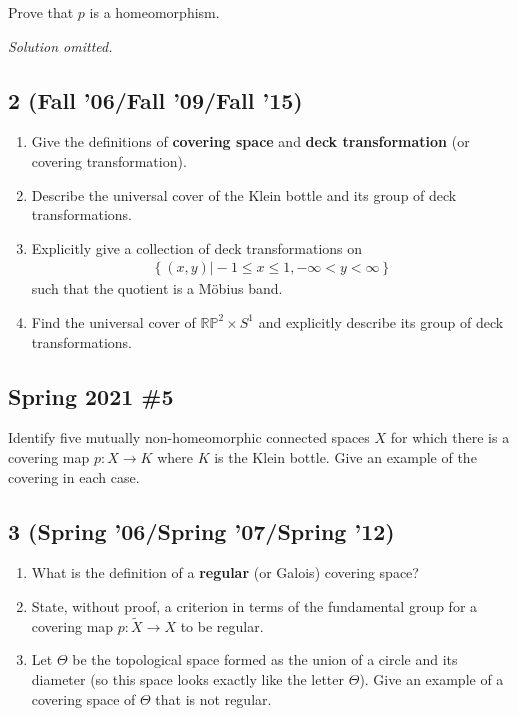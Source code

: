 Prove that \(p\) is a homeomorphism.


\emph{Solution omitted.}

\hypertarget{fall-06fall-09fall-15}{%
\subsection{2 (Fall '06/Fall '09/Fall
'15)}\label{fall-06fall-09fall-15}}

\begin{enumerate}
\def\labelenumi{\alph{enumi}.}
\item
  Give the definitions of \textbf{covering space} and \textbf{deck
  transformation} (or covering transformation).
\item
  Describe the universal cover of the Klein bottle and its group of deck
  transformations.
\item
  Explicitly give a collection of deck transformations on
  \begin{align*}\left\{{(x, y) \mathrel{\Big|}-1 \leq x \leq 1, -\infty < y < \infty}\right\}\end{align*}
  such that the quotient is a Möbius band.
\item
  Find the universal cover of \({\mathbb{RP}}^2 \times S^1\) and
  explicitly describe its group of deck transformations.
\end{enumerate}

\hypertarget{spring-2021-5}{%
\subsection{Spring 2021 \#5}\label{spring-2021-5}}

\begin{problem}[Spring 2021, 5]

Identify five mutually non-homeomorphic connected spaces \(X\) for which
there is a covering map \(p:X\to K\) where \(K\) is the Klein bottle.
Give an example of the covering in each case.

\end{problem}

\hypertarget{spring-06spring-07spring-12}{%
\subsection{3 (Spring '06/Spring '07/Spring
'12)}\label{spring-06spring-07spring-12}}

\begin{enumerate}
\def\labelenumi{\alph{enumi}.}
\item
  What is the definition of a \textbf{regular} (or Galois) covering
  space?
\item
  State, without proof, a criterion in terms of the fundamental group
  for a covering map \(p : \tilde X \to X\) to be regular.
\item
  Let \(\Theta\) be the topological space formed as the union of a
  circle and its diameter (so this space looks exactly like the letter
  \(\Theta\)). Give an example of a covering space of \(\Theta\) that is
  not regular.
\end{enumerate}

